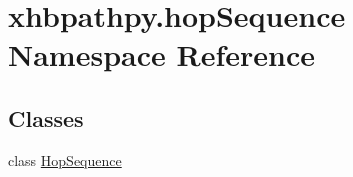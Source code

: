 \hypertarget{namespacexhbpathpy_1_1hop_sequence}{\section{xhbpathpy.\-hop\-Sequence Namespace Reference}
\label{namespacexhbpathpy_1_1hop_sequence}
}
\subsection*{Classes}
\begin{DoxyCompactItemize}
\item 
class \hyperlink{classxhbpathpy_1_1hop_sequence_1_1_hop_sequence}{Hop\-Sequence}
\end{DoxyCompactItemize}
